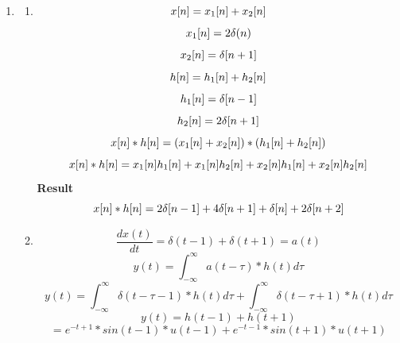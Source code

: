 \documentclass[10pt,a4paper, margin=1in]{article}
\begin{document}
\begin{enumerate}
\item %
	\begin{enumerate}
    \item %
    \begin{equation*}
           x[n] = x_1[n] + x_2[n]\\ 
    \end{equation*}
    \begin{equation*}
    x_1[n] = 2\delta(n)\\
     \end{equation*}
   \begin{equation*}
    x_2[n] = \delta[n+1]\\
    \end{equation*}
    \begin{equation*}
    h[n] = h_1[n] + h_2[n]\\
    \end{equation*}
    \begin{equation*}
    h_1[n] = \delta[n-1]\\
    \end{equation*}
    \begin{equation*}
    h_2[n] = 2\delta[n+1]\\
    \end{equation*}
    \begin{equation*}
    x[n]*h[n] = (x_1[n] + x_2[n])*(h_1[n] + h_2[n])\\
    \end{equation*}
    \begin{equation*}
    x[n]*h[n] =  x_1[n]h_1[n] + x_1[n]h_2[n] + x_2[n]h_1[n] + x_2[n]h_2[n]\\
    \end{equation*}
    \textbf{Result}
        \begin{equation}
    x[n]*h[n] =  2\delta[n-1] + 4\delta[n+1] + \delta[n] + 2\delta[n+2]\\
        \end{equation}

    \item %
    \begin{equation*}
    \frac{dx(t)}{dt} = \delta(t-1) + \delta(t+1) = a(t)
    \end{equation*}
    \begin{equation*}
    y(t) = \int_{-\infty}^{\infty}a(t-\tau)*h(t) d\tau
    \end{equation*}
    \begin{equation*}
        y(t) = \int_{-\infty}^{\infty}\delta(t-\tau-1)*h(t)d\tau + \int_{-\infty}^{\infty}\delta(t-\tau+1)*h(t)d\tau
    \end{equation*}
    \begin{equation*}
       y(t) = h(t-1) + h(t+1) 
    \end{equation*}
    \begin{equation}
        = e^{-t+1}*sin(t-1)*u(t-1) + e^{-t-1}*sin(t+1)*u(t+1)
    \end{equation}
    \end{enumerate}


\end{enumerate}
\end{document}
